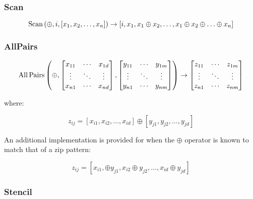 \subsubsection{Scan}

\begin{equation}
\operatorname*{Scan} \left( \oplus, i, [x_1,x_2,\ldots,x_n] \right)
\to
\left[ i, x_1, x_1 \oplus x_2, \ldots, x_1 \oplus x_2 \oplus \ldots \oplus x_n \right]
\end{equation}

\subsubsection{AllPairs}

\begin{equation}
\operatorname*{All\,Pairs} \left( \oplus,
\begin{bmatrix}
  x_{11} & \cdots & x_{1d} \\
  \vdots & \ddots & \vdots \\
  x_{n1} & \cdots & x_{nd}
\end{bmatrix},
\begin{bmatrix}
  y_{11} & \cdots & y_{1m} \\
  \vdots & \ddots & \vdots \\
  y_{n1} & \cdots & y_{nm}
\end{bmatrix} \right)
\to
\begin{bmatrix}
  z_{11} & \cdots & z_{1m} \\
  \vdots & \ddots & \vdots \\
  z_{n1} & \cdots & z_{nm}
\end{bmatrix}
\end{equation}

where:

\begin{equation}
z_{ij} =
\left[ x_{i1}, x_{i2}, \ldots, x_{id} \right] \oplus
\left[ y_{j1}, y_{j2}, \ldots, y_{jd} \right]
\end{equation}

An additional implementation is provided for when the $\oplus$
operator is known to match that of a zip pattern:

\begin{equation}
z_{ij} =
\left[
  x_{i1}, \oplus y_{j1}, x_{i2} \oplus y_{j2}, \ldots, x_{id} \oplus y_{jd}
\right]
\end{equation}


\subsubsection{Stencil}

